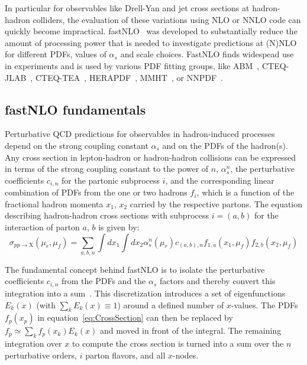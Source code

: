 \documentclass{PoS}
\begin{document}
In particular for observables like Drell-Yan and jet cross sections at
hadron-hadron colliders, the evaluation of these variations using
NLO or NNLO
code can quickly become impractical.
fastNLO~\cite{Britzger:2012bs,Wobisch:2011ij,Kluge:2006xs} was developed
to substantially reduce the amount of processing power that is needed to
investigate predictions at (N)NLO for different PDFs, values of
$\alpha_s$ and scale choices.
  FastNLO finds widespead use in experiments and is used by various PDF fitting groups,
  like ABM~\cite{Alekhin:2013nda}, CTEQ-JLAB~\cite{Owens:2012bv},
  CTEQ-TEA~\cite{Dulat:2015mca}, HERAPDF~\cite{Abramowicz:2015mha},
  MMHT~\cite{Harland-Lang:2014zoa}, or NNPDF~\cite{Ball:2014uwa}.

\subsection{fastNLO fundamentals}

Perturbative QCD predictions for observables in hadron-induced
processes depend on the strong coupling constant $\alpha_s$ and on the
PDFs of the hadron(s). Any cross section in lepton-hadron or
hadron-hadron collisions can be expressed in terms of the
strong coupling constant to the power of $n$, $\alpha_s^n$, the
perturbative coefficients $c_{i,n}$ for the partonic subprocess $i$,
and the corresponding linear combination of PDFs from the one or two
hadrons $f_i$, which is a function of the fractional hadron momenta
$x_1$, $x_2$ carried by the respective partons.
The equation describing hadron-hadron cross sections with subprocess $i=(a,b)$
for the interaction of parton $a$, $b$ is given by:
\begin{equation}\label{eq:CrossSection}
  \sigma_{pp\rightarrow\mathrm{X}}(\mu_r,\mu_f) =
  \sum\limits_{a,b,n}\int\limits dx_1\int\limits dx_2
    \alpha_s^n(\mu_r) c_{(a,b),n} f_{1,a}(x_1,\mu_f) f_{2,b}(x_2,\mu_f)
\end{equation}

The fundamental concept behind fastNLO is to isolate the perturbative
coefficients $c_{i,n}$ from the PDFs and the $\alpha_s$ factors and thereby
convert this integration into a sum~\cite{Pascaud:1994vx,Wobisch:00}.
This discretization introduces a set of eigenfunctions $E_k(x)$
(with $\sum_k E_k(x) \equiv 1$) around a defined number of $x$-values.
The PDFs $f_p(x_p)$ in equation~\ref{eq:CrossSection} can then be replaced
by $f_p \simeq \sum_k f_p(x_k) E_k(x)$ and moved in front of the integral.
The remaining integration over $x$ to compute the cross section is
turned into a sum over the $n$ perturbative orders, $i$ parton flavors,
and all $x$-nodes.
\end{document}
